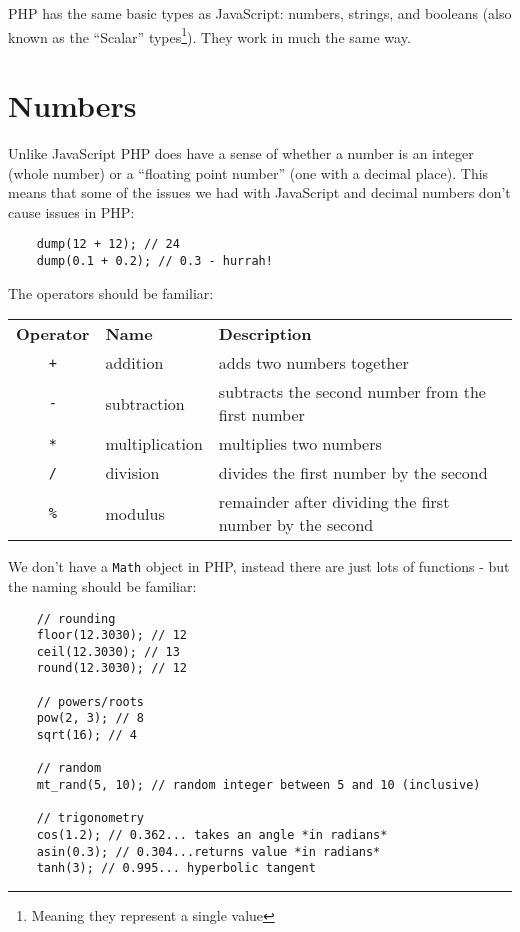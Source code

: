 PHP has the same basic types as JavaScript: numbers, strings, and booleans (also known as the ``Scalar'' types\footnote{Meaning they represent a single value}). They work in much the same way.


\section{Numbers}

Unlike JavaScript PHP does have a sense of whether a number is an integer (whole number) or a ``floating point number'' (one with a decimal place). This means that some of the issues we had with JavaScript and decimal numbers don't cause issues in PHP:

\begin{verbatim}
    dump(12 + 12); // 24
    dump(0.1 + 0.2); // 0.3 - hurrah!
\end{verbatim}


The operators should be familiar:
\\

\begin{small}
    \begin{tabularx}{\textwidth}{c l X}
        \textbf{Operator} & \textbf{Name} & \textbf{Description} \\
        \texttt{+}  & addition        & adds two numbers together \\
        \texttt{-}  & subtraction     & subtracts the second number from the first number \\
        \texttt{*}  & multiplication  & multiplies two numbers \\
        \texttt{/}  & division        & divides the first number by the second \\
        \texttt{\%} & modulus         & remainder after dividing the first number by the second
    \end{tabularx}
\end{small}

\par\bigskip


We don't have a \texttt{Math} object in PHP, instead there are just lots of functions - but the naming should be familiar:

\begin{verbatim}
    // rounding
    floor(12.3030); // 12
    ceil(12.3030); // 13
    round(12.3030); // 12

    // powers/roots
    pow(2, 3); // 8
    sqrt(16); // 4

    // random
    mt_rand(5, 10); // random integer between 5 and 10 (inclusive)

    // trigonometry
    cos(1.2); // 0.362... takes an angle *in radians*
    asin(0.3); // 0.304...returns value *in radians*
    tanh(3); // 0.995... hyperbolic tangent
\end{verbatim}


